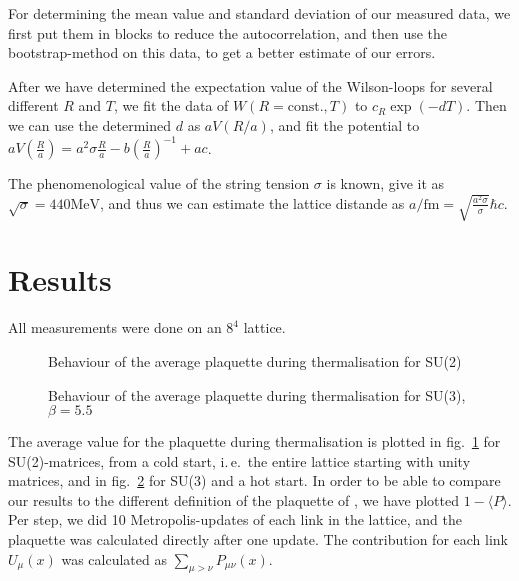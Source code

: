 \documentclass[%
 reprint,
 amsmath,amssymb,
 aps,
]{revtex4-1}
\begin{document}
For determining the mean value and standard deviation of our measured data, we first put them in blocks to reduce the autocorrelation, and then use the bootstrap-method on this data, to get a better estimate of our errors.

After we have determined the expectation value of the Wilson-loops for several different $R$ and $T$, we fit the data of $W(R=\text{const.}, T)$ to $c_R\exp(-dT)$. Then we can use the determined $d$ as $aV(R/a)$, and fit the potential to $aV\left(\frac{R}{a}\right)=a^2\sigma \frac{R}{a}-b\left(\frac{R}{a}\right)^{-1}+ac$.

The phenomenological value of the string tension $\sigma$ is known, \citet{Cardoso_2011} give it as $\sqrt{\sigma}=440\si{\mega\electronvolt}$, and thus we can estimate the lattice distande as $a/\si{\femto\meter}=\sqrt{\frac{a^2\sigma}{\sigma}}\hbar c$.

\section{Results}

All measurements were done on an $8^4$ lattice.

 \begin{figure}
 	\centering

\caption[Behaviour of the plaquette for SU(2)]{Behaviour of the average plaquette during thermalisation for SU(2)}
\label{fig:comparisoncreutz}
\end{figure} 


\begin{figure}
	\centering
	
	\caption[Behaviour of the plaquette for SU(3)]{Behaviour of the average plaquette during thermalisation for SU(3), $\beta=5.5$}
	\label{fig:plaquettethermsu3}
\end{figure} 

The average value for the plaquette during thermalisation is plotted in fig.~\ref{fig:comparisoncreutz} for SU(2)-matrices, from a cold start, i.\,e.\, the entire lattice starting with unity matrices, and in fig.~\ref{fig:plaquettethermsu3} for SU(3) and a hot start. In order to be able to compare our results to the different definition of the plaquette of \citet{creutzsu2}, we have plotted $1-\langle P\rangle$. Per step, we did 10 Metropolis-updates of each link in the lattice, and the plaquette was calculated directly after one update. The contribution for each link $U_\mu(x)$ was calculated as $\sum_{\mu>\nu}P_{\mu\nu}(x)$.
\end{document}
